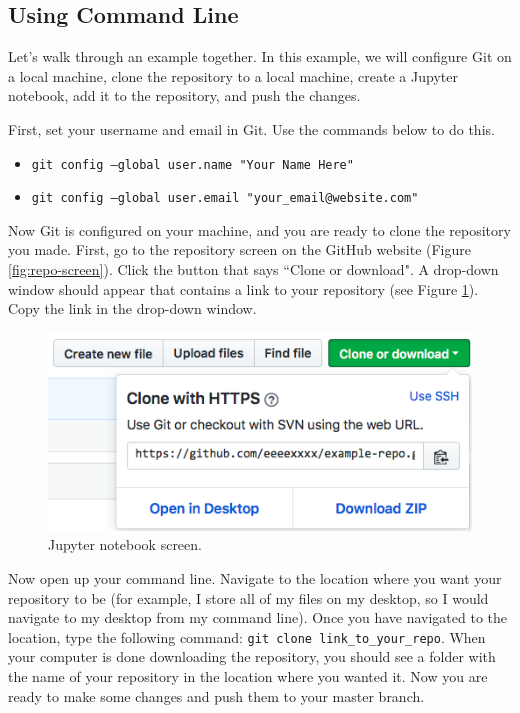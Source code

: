 \documentclass[11pt,a4paper]{article}
\begin{document}
\subsection*{Using Command Line}
Let's walk through an example together.
In this example, we will configure Git on a local machine, clone the repository to a local machine, create a Jupyter notebook, add it to the repository, and push the changes.

First, set your username and email in Git.
Use the commands below to do this.

\begin{itemize}
\item[] \texttt{git config --global user.name "Your Name Here"}
\item[] \texttt{git config --global user.email "your\_email@website.com"}
\end{itemize}

Now Git is configured on your machine, and you are ready to clone the repository you made.
First, go to the repository screen on the GitHub website (Figure \ref{fig:repo-screen}).
Click the button that says ``Clone or download".
A drop-down window should appear that contains a link to your repository (see Figure \ref{fig:clone-screen}).
Copy the link in the drop-down window.

\begin{figure}[h]
\centering
\includegraphics[width=.7\textwidth]{figures/clone_screen.png}
\caption{Jupyter notebook screen.}
\label{fig:clone-screen}
\end{figure}

Now open up your command line.
Navigate to the location where you want your repository to be (for example, I store all of my files on my desktop, so I would navigate to my desktop from my command line).
Once you have navigated to the location, type the following command: \texttt{git clone link\_to\_your\_repo}.
When your computer is done downloading the repository, you should see a folder with the name of your repository in the location where you wanted it.
Now you are ready to make some changes and push them to your master branch.
\end{document}
